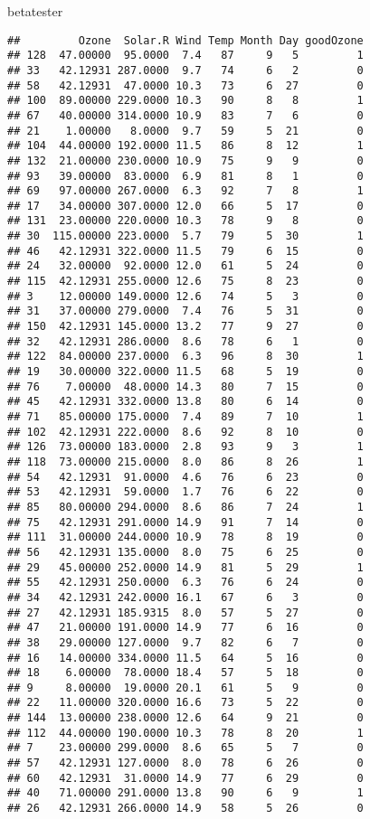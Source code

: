 \documentclass[]{article}
\newenvironment{Shaded}{\begin{snugshade}}{\end{snugshade}}
\newcommand{\NormalTok}[1]{#1}
\begin{document}
\begin{Shaded}
\begin{Highlighting}[]
\NormalTok{betatester}
\end{Highlighting}
\end{Shaded}

\begin{verbatim}
##         Ozone  Solar.R Wind Temp Month Day goodOzone
## 128  47.00000  95.0000  7.4   87     9   5         1
## 33   42.12931 287.0000  9.7   74     6   2         0
## 58   42.12931  47.0000 10.3   73     6  27         0
## 100  89.00000 229.0000 10.3   90     8   8         1
## 67   40.00000 314.0000 10.9   83     7   6         0
## 21    1.00000   8.0000  9.7   59     5  21         0
## 104  44.00000 192.0000 11.5   86     8  12         1
## 132  21.00000 230.0000 10.9   75     9   9         0
## 93   39.00000  83.0000  6.9   81     8   1         0
## 69   97.00000 267.0000  6.3   92     7   8         1
## 17   34.00000 307.0000 12.0   66     5  17         0
## 131  23.00000 220.0000 10.3   78     9   8         0
## 30  115.00000 223.0000  5.7   79     5  30         1
## 46   42.12931 322.0000 11.5   79     6  15         0
## 24   32.00000  92.0000 12.0   61     5  24         0
## 115  42.12931 255.0000 12.6   75     8  23         0
## 3    12.00000 149.0000 12.6   74     5   3         0
## 31   37.00000 279.0000  7.4   76     5  31         0
## 150  42.12931 145.0000 13.2   77     9  27         0
## 32   42.12931 286.0000  8.6   78     6   1         0
## 122  84.00000 237.0000  6.3   96     8  30         1
## 19   30.00000 322.0000 11.5   68     5  19         0
## 76    7.00000  48.0000 14.3   80     7  15         0
## 45   42.12931 332.0000 13.8   80     6  14         0
## 71   85.00000 175.0000  7.4   89     7  10         1
## 102  42.12931 222.0000  8.6   92     8  10         0
## 126  73.00000 183.0000  2.8   93     9   3         1
## 118  73.00000 215.0000  8.0   86     8  26         1
## 54   42.12931  91.0000  4.6   76     6  23         0
## 53   42.12931  59.0000  1.7   76     6  22         0
## 85   80.00000 294.0000  8.6   86     7  24         1
## 75   42.12931 291.0000 14.9   91     7  14         0
## 111  31.00000 244.0000 10.9   78     8  19         0
## 56   42.12931 135.0000  8.0   75     6  25         0
## 29   45.00000 252.0000 14.9   81     5  29         1
## 55   42.12931 250.0000  6.3   76     6  24         0
## 34   42.12931 242.0000 16.1   67     6   3         0
## 27   42.12931 185.9315  8.0   57     5  27         0
## 47   21.00000 191.0000 14.9   77     6  16         0
## 38   29.00000 127.0000  9.7   82     6   7         0
## 16   14.00000 334.0000 11.5   64     5  16         0
## 18    6.00000  78.0000 18.4   57     5  18         0
## 9     8.00000  19.0000 20.1   61     5   9         0
## 22   11.00000 320.0000 16.6   73     5  22         0
## 144  13.00000 238.0000 12.6   64     9  21         0
## 112  44.00000 190.0000 10.3   78     8  20         1
## 7    23.00000 299.0000  8.6   65     5   7         0
## 57   42.12931 127.0000  8.0   78     6  26         0
## 60   42.12931  31.0000 14.9   77     6  29         0
## 40   71.00000 291.0000 13.8   90     6   9         1
## 26   42.12931 266.0000 14.9   58     5  26         0
\end{verbatim}
\end{document}
